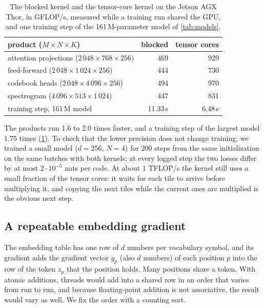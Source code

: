 \begin{table}[htbp]
\centering
\caption{The blocked kernel and the tensor-core kernel on the Jetson AGX Thor,
in GFLOP/s, measured while a training run shared the GPU, and one training
step of the 161\,M-parameter model of \cref{tab:models}.}
\label{tab:tensor-cores}
\footnotesize
\begin{tabular}{lrr}
\toprule
product ($M \times N \times K$) & blocked & tensor cores \\
\midrule
attention projections ($2\,048 \times 768 \times 256$) & 469 & 929 \\
feed-forward ($2\,048 \times 1\,024 \times 256$) & 444 & 730 \\
codebook heads ($2\,048 \times 4\,096 \times 256$) & 494 & 970 \\
spectrogram ($4\,096 \times 513 \times 1\,024$) & 447 & 831 \\
\midrule
training step, 161\,M model & 11.33\,s & 6.48\,s \\
\bottomrule
\end{tabular}
\end{table}

The products run 1.6 to 2.0 times faster, and a training step of the largest
model 1.75 times (\cref{tab:tensor-cores}). To check that the lower precision
does not change training, we trained a small model ($d = 256$, $N = 4$) for 200
steps from the same initialization on the same batches with both kernels; at
every logged step the two losses differ by at most $2 \cdot 10^{-5}$ nats per
code. At about 1 TFLOP/s the kernel still uses a small fraction of the tensor
cores: it waits for each tile to arrive before multiplying it, and copying the
next tiles while the current ones are multiplied is the obvious next step.

\subsection{A repeatable embedding gradient}

The embedding table has one row of $d$ numbers per vocabulary symbol, and its
gradient adds the gradient vector $g_p$ (also $d$ numbers) of each position $p$
into the row of the token $z_p$ that the position holds. Many positions share a token. With atomic
additions, threads would add into a shared row in an order that varies from
run to run, and because floating-point addition is not associative, the result
would vary as well. We fix the order with a counting sort.

